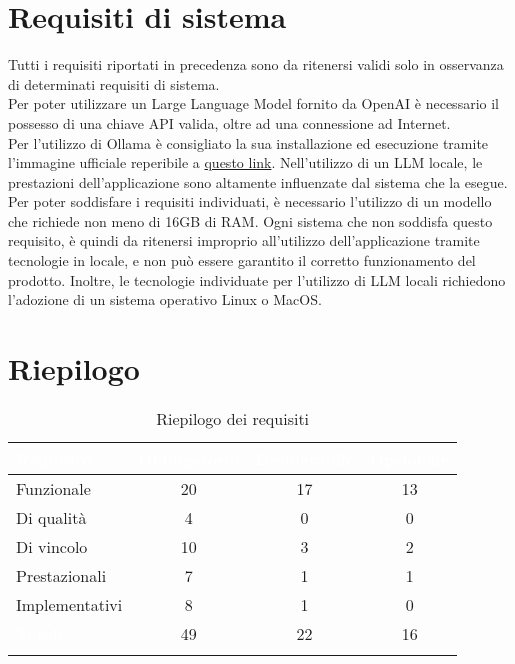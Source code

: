 \section{Requisiti di sistema}
Tutti i requisiti riportati in precedenza sono da ritenersi validi solo in osservanza di determinati requisiti di sistema.\\
Per poter utilizzare un Large Language Model fornito da OpenAI è necessario il possesso di una chiave API valida, oltre ad una connessione ad Internet.\\
Per l'utilizzo di Ollama è consigliato la sua installazione ed esecuzione tramite l'immagine  ufficiale reperibile a \href{https://ollama.ai/blog/ollama-is-now-available-as-an-official-docker-image}{questo link}.
Nell'utilizzo di un LLM locale, le prestazioni dell'applicazione sono altamente influenzate dal sistema che la esegue. Per poter soddisfare i requisiti individuati, è necessario l'utilizzo di un modello che richiede non meno di 16GB di RAM. Ogni sistema che non soddisfa questo requisito, è quindi da ritenersi improprio all'utilizzo dell'applicazione tramite tecnologie in locale, e non può essere garantito il corretto funzionamento del prodotto. Inoltre, le tecnologie individuate per l'utilizzo di LLM locali richiedono l'adozione di un sistema operativo Linux o MacOS.

\section{Riepilogo}
\begingroup
\setlength{\tabcolsep}{10pt}
\renewcommand{\arraystretch}{1.5}
\begin{xltabular}{\textwidth}{| X | c | c | c |}
    \hline
     \textbf{\textcolor{white}{Requisito}} & \textbf{\textcolor{white}{Obbligatorio}} & \textbf{\textcolor{white}{Desiderabile}} & \textbf{\textcolor{white}{Opzionale}}\\
    \hline
    \endhead
    Funzionale & 20 & 17 & 13 \\
    \hline
    Di qualità & 4 & 0 & 0 \\
    \hline
    Di vincolo & 10 & 3 & 2 \\
    \hline
    Prestazionali & 7 & 1 & 1 \\
    \hline
    Implementativi & 8 & 1 & 0 \\
    \hline
     \textbf{\textcolor{white}{Totale}} & 49 & 22 & 16 \\
    \hline
     \caption{Riepilogo dei requisiti}
    \label{tab:riepilogo}
\end{xltabular}
\endgroup

